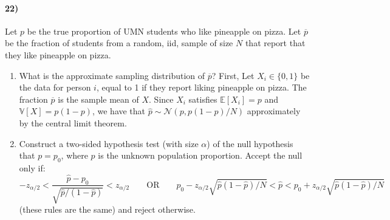 \documentclass[12pt]{article}
\newcommand\ov{\overline}
\newcommand\BB{\mathbb}
\newcommand\EE{\mathbb{E}}
\newcommand\h{\hat}
\numberwithin{equation}{section}
\numberwithin{figure}{section}
\numberwithin{table}{section}
\begin{document}
\paragraph{22)} Let $p$ be the true proportion of UMN students who like pineapple on pizza. Let $\ov{p}$ be the fraction of students from a random, iid, sample of size $N$ that report that they like pineapple on pizza.
\begin{enumerate}
\item What is the approximate sampling distribution of $\ov{p}$? {\color{blue} First, Let $X_i\in\{0,1\}$ be the data for person $i$, equal to 1 if they report liking pineapple on pizza. The fraction $\ov{p}$ is the sample mean of $X$. Since $X_i$ satisfies $\EE[X_i] = p$ and $\BB{V}[X] = p(1-p)$, we have that $\h{p}\sim\mathcal{N}(p,p(1-p)/N)$ approximately by the central limit theorem.
}
\item Construct a two-sided hypothesis test (with size $\alpha$) of the null hypothesis that $p=p_0$, where $p$ is the unknown population proportion.
{\color{blue}
Accept the null only if:
\[-z_{\alpha/2}<\frac{\h{p}-p_0}{\sqrt{\h{p}/(1-\h{p})}}<z_{\alpha/2}\qquad \text{OR}\qquad p_0-z_{\alpha/2}\sqrt{\h{p}(1-\h{p})/N}<\h{p}<p_0+z_{\alpha/2}\sqrt{\h{p}(1-\h{p})/N}\]
(these rules are the same) and reject otherwise.
}
\end{enumerate}
\end{document}
